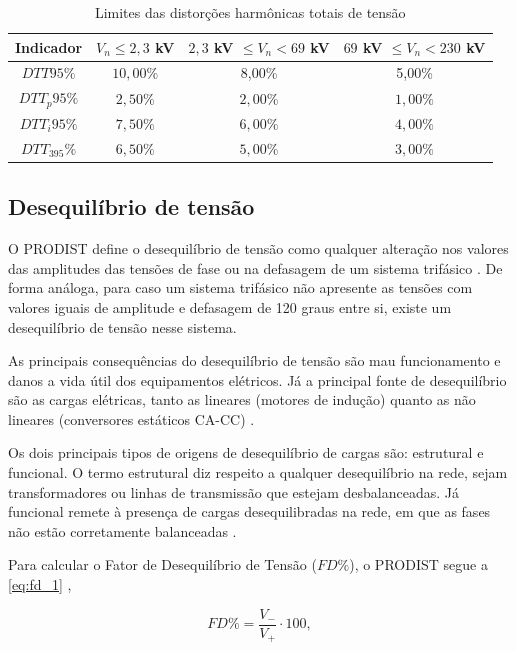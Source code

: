 \begin{table}[H]
  \centering
  \caption{Limites das distorções harmônicas totais de tensão}
  \label{tab:limites_distorcoes_harmonicas}
  \begin{tabular}{@{}cccc@{}}
  \toprule
  \textbf{Indicador} & \textbf{$V_n\leq 2,3$ kV} & \textbf{$2,3$ kV $\leq V_n<69$ kV} & \textbf{$69$ kV $\leq V_n<230$ kV} \\ \midrule
  $DTT95\%$ & $10,00\%$ & 8,00\% & 5,00\% \\
  $DTT_p95\%$ & $2,50\%$ & $2,00\%$ & $1,00\%$ \\
  $DTT_i95\%$ & $7,50\%$ & $6,00\%$ & $4,00\%$ \\
  $DTT_395\%$ & $6,50\%$ & $5,00\%$ & $3,00\%$ \\ \bottomrule
  \end{tabular}
\end{table}

\subsection{Desequilíbrio de tensão}

O PRODIST define o desequilíbrio de tensão como qualquer alteração nos valores das amplitudes das tensões de fase ou na defasagem de um sistema trifásico \cite{ref:ANEEL2021}. De forma análoga, para  caso um sistema trifásico não apresente as tensões com valores iguais de amplitude e defasagem de 120 graus entre si, existe um desequilíbrio de tensão nesse sistema.

As principais consequências do desequilíbrio de tensão são mau funcionamento e danos a vida útil dos equipamentos elétricos. Já a principal fonte de desequilíbrio são as cargas elétricas, tanto as lineares (motores de indução) quanto as não lineares (conversores estáticos CA-CC) \cite{ref:paulilo_2013}.

Os dois principais tipos de origens de desequilíbrio de cargas são: estrutural e funcional. O termo estrutural diz respeito a qualquer desequilíbrio na rede, sejam transformadores ou linhas de transmissão que estejam desbalanceadas. Já funcional remete à presença de cargas desequilibradas na rede, em que as fases não estão corretamente balanceadas \cite{ref:rezende_2012}.

Para calcular o Fator de Desequilíbrio de Tensão ($FD\%$), o PRODIST segue a \autoref{eq:fd_1} \cite{ref:ANEEL2021},

\begin{equation}
  FD\% = \frac{V_-}{V_+}\cdot 100,
  \label{eq:fd_1}
\end{equation}


